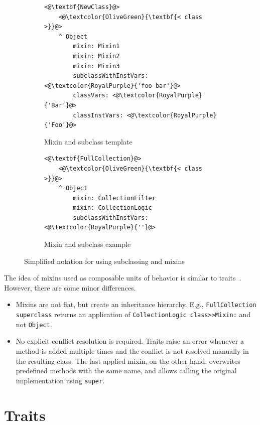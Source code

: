 \begin{figure}[!htp]
\begin{subfigure}[b]{0.45\textwidth}
\begin{lstlisting}
<@\textbf{NewClass}@>
    <@\textcolor{OliveGreen}{\textbf{< class >}}@>
    ^ Object
        mixin: Mixin1
        mixin: Mixin2
        mixin: Mixin3
        subclassWithInstVars: <@\textcolor{RoyalPurple}{'foo bar'}@>
        classVars: <@\textcolor{RoyalPurple}{'Bar'}@>
        classInstVars: <@\textcolor{RoyalPurple}{'Foo'}@>
\end{lstlisting}
\caption{Mixin and subclass template}
\end{subfigure}
\qquad
\begin{subfigure}[b]{0.45\textwidth}
\begin{lstlisting}
<@\textbf{FullCollection}@>
    <@\textcolor{OliveGreen}{\textbf{< class >}}@>
    ^ Object
        mixin: CollectionFilter
        mixin: CollectionLogic
        subclassWithInstVars: <@\textcolor{RoyalPurple}{''}@>
\end{lstlisting}
\caption{Mixin and subclass example}
\end{subfigure}
\caption{Simplified notation for using subclassing and mixins}
\label{fig:usecase_subcl_mixin}
\end{figure}

The idea of mixins used as composable units of behavior is similar to traits~\cite{traitsschaerli}. However, there are some minor differences.
\begin{itemize}
    \item Mixins are not flat, but create an inheritance hierarchy. E.g., \texttt{FullCollection superclass} returns an application of \texttt{CollectionLogic class>>Mixin:} and not \texttt{Object}.
    \item No explicit conflict resolution is required. Traits raise an error whenever a method is added multiple times and the conflict is not resolved manually in the resulting class. The last applied mixin, on the other hand, overwrites predefined methods with the same name, and allows calling the original implementation using \texttt{super}.
\end{itemize}


\section{Traits}

